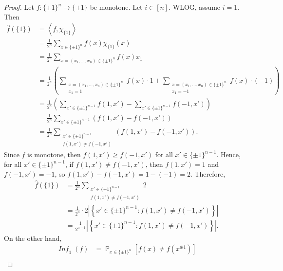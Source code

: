 \documentclass[letterpaper, reqno,11pt]{article}
\newcommand{\PP}{\mathop{{}\mathbb{P}}}
\DeclareMathOperator{\Inf}{\mathit{Inf}}
\begin{document}
\begin{enumerate}
\begin{enumerate}
    \begin{proof}
      Let $f : \{ \pm 1 \}^n \to \{ \pm 1 \}$ be monotone. Let $i \in [n]$. WLOG, assume $i = 1$. Then
      \begin{align*}
        \hat{f}(\{ 1 \}) &= \left\langle f, \chi_{\{ 1 \}} \right\rangle \\
        &= \frac{1}{2^n} \sum_{x \in \{ \pm 1 \}^n} f(x) \chi_{\{ 1 \}}(x) \\
        &= \frac{1}{2^n} \sum_{x = \left(x_1, \ldots, x_n\right) \in \{ \pm 1 \}^n} f(x) x_1 \\
        &= \frac{1}{2^n}\left(\sum_{\substack{x = \left(x_1, \ldots, x_n\right) \in \{ \pm 1 \}^n \\ x_1 = 1}} f(x) \cdot 1 + \sum_{\substack{x = \left(x_1, \ldots, x_n\right) \in \{ \pm 1 \}^n \\ x_1 = -1}} f(x) \cdot (-1)\right) \\
        &= \frac{1}{2^n} \left(\sum_{x' \in \{ \pm 1 \}^{n - 1}} f\left(1, x'\right) - \sum_{x' \in \{ \pm 1 \}^{n - 1}} f\left(-1, x'\right)\right) \\
        &= \frac{1}{2^n} \sum_{x' \in \{ \pm 1 \}^{n - 1}} \left(f\left(1, x'\right) - f\left(-1, x'\right)\right) \\
        &= \frac{1}{2^n} \sum_{\substack{x' \in \{ \pm 1 \}^{n - 1} \\ f\left(1, x'\right) \neq f\left(-1, x'\right)}} \left(f\left(1, x'\right) - f\left(-1, x'\right)\right).
      \end{align*}
      Since $f$ is monotone, then $f(1, x') \geq f(-1, x')$ for all $x' \in \{ \pm 1 \}^{n - 1}$. Hence, for all $x' \in \{ \pm 1 \}^{n - 1}$, if $f(1, x') \neq f(-1, x')$, then $f(1, x') = 1$ and $f(-1, x') = -1$, so $f(1, x') - f(-1, x') = 1 - (-1) = 2$. Therefore,
      \begin{align*}
        \hat{f}(\{ 1 \}) &= \frac{1}{2^n} \sum_{\substack{x' \in \{ \pm 1 \}^{n - 1} \\ f\left(1, x'\right) \neq f\left(-1, x'\right)}} 2 \\
        &= \frac{1}{2^n} \cdot 2 \left|\left\{ x' \in \{ \pm 1 \}^{n - 1} : f\left(1, x'\right) \neq f\left(-1, x'\right) \right\}\right| \\
        &= \frac{1}{2^{n - 1}} \left|\left\{ x' \in \{ \pm 1 \}^{n - 1} : f\left(1, x'\right) \neq f\left(-1, x'\right) \right\}\right|.
      \end{align*}
      On the other hand,
      \begin{align*}
        \Inf_1(f) &= \PP_{x \in \{ \pm 1 \}^n}\left[f(x) \neq f\left(x^{\oplus 1}\right)\right] \\

\end{align*}
\end{proof}
\end{enumerate}
\end{enumerate}
\end{document}

